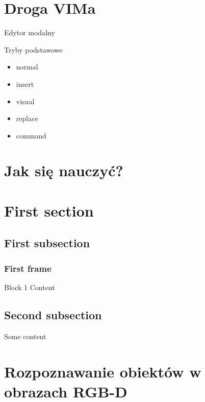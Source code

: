 \documentclass{beamer}
\begin{document}
\section{Droga VIMa}
\label{sec:Droga VIMa}

\begin{frame}[t]{Edytor modalny}
  \begin{block}{Tryby podstawowe}
    \begin{itemize}
      \item normal
      \item insert
      \item visual
      \item replace
      \item command
    \end{itemize}
  \end{block}
\end{frame}

\section{Jak się nauczyć?}
\label{sec:Jak się nauczyć?}



\section{First section}
\subsection{First subsection}
\begin{frame}
\frametitle{First frame}
\begin{block}{Block 1}
Content
\end{block}
\end{frame}

\subsection{Second subsection}
\begin{frame}
Some content
\end{frame}

\section{Rozpoznawanie obiektów w obrazach RGB-D}
\end{document}
